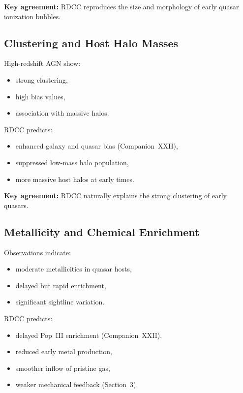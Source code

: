 \documentclass[11pt,a4paper]{article}
\begin{document}
\textbf{Key agreement:}  
RDCC reproduces the size and morphology of early quasar ionization bubbles.

\subsection{Clustering and Host Halo Masses}

High-redshift AGN show:
\begin{itemize}
\item strong clustering,
\item high bias values,
\item association with massive halos.
\end{itemize}

RDCC predicts:
\begin{itemize}
\item enhanced galaxy and quasar bias (Companion~XXII),
\item suppressed low-mass halo population,
\item more massive host halos at early times.
\end{itemize}

\textbf{Key agreement:}  
RDCC naturally explains the strong clustering of early quasars.

\subsection{Metallicity and Chemical Enrichment}

Observations indicate:
\begin{itemize}
\item moderate metallicities in quasar hosts,
\item delayed but rapid enrichment,
\item significant sightline variation.
\end{itemize}

RDCC predicts:
\begin{itemize}
\item delayed Pop~III enrichment (Companion~XXII),
\item reduced early metal production,
\item smoother inflow of pristine gas,
\item weaker mechanical feedback (Section~3).
\end{itemize}
\end{document}

